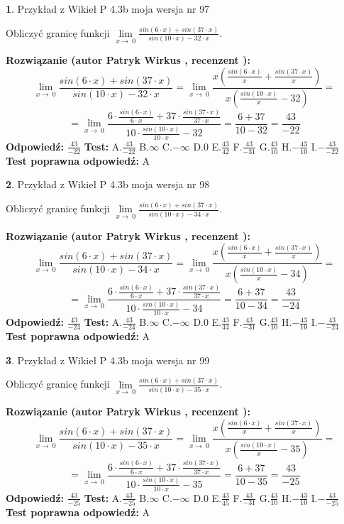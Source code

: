 \documentclass[12pt, a4paper]{article}
\theoremstyle{definition} %
\newtheorem{zad}{}
\newcommand{\zadStart}[1]{\begin{zad}#1\newline}
\newcommand{\zadStop}{\end{zad}}
\newcommand{\rozwStart}[2]{\noindent \textbf{Rozwiązanie (autor #1 , recenzent #2): }\newline}
\newcommand{\rozwStop}{\newline}
\newcommand{\odpStart}{\noindent \textbf{Odpowiedź:}\newline}
\newcommand{\odpStop}{\newline}
\newcommand{\testStart}{\noindent \textbf{Test:}\newline}
\newcommand{\testStop}{\newline}
\newcommand{\kluczStart}{\noindent \textbf{Test poprawna odpowiedź:}\newline}
\newcommand{\kluczStop}{\newline}
\begin{document}
\zadStart{Przykład z Wikieł P 4.3b moja wersja nr 97}


Obliczyć granicę funkcji $\lim\limits_{x\to\ 0}\frac{sin(6 \cdot x)+sin(37 \cdot x)}{sin(10 \cdot x)-32 \cdot x}$.
\zadStop
\rozwStart{Patryk Wirkus}{}
$$\lim\limits_{x\to\ 0}\frac{sin(6 \cdot x)+sin(37 \cdot x)}{sin(10 \cdot x)-32 \cdot x}=\lim\limits_{x\to\ 0}\frac{x(\frac{sin(6 \cdot x)}{x}+\frac{sin(37 \cdot x)}{x})}{x(\frac{sin(10 \cdot x)}{x}-32)}=$$
$$=\lim\limits_{x\to\ 0}\frac{6 \cdot \frac{sin(6 \cdot x)}{6 \cdot x}+37 \cdot \frac{sin(37 \cdot x)}{37 \cdot x}}{10 \cdot \frac{sin(10 \cdot x)}{10 \cdot x}-32}=\frac{6+37}{10-32} = \frac{43}{-22}$$
\rozwStop
\odpStart
$\frac{43}{-22}$
\odpStop
\testStart
A.$\frac{43}{-22}$
B.$\infty$
C.$-\infty$
D.$0$
E.$\frac{43}{42}$
F.$\frac{43}{-31}$
G.$\frac{43}{10}$
H.$-\frac{43}{10}$
I.$-\frac{43}{-22}$
\testStop
\kluczStart
A
\kluczStop



\zadStart{Przykład z Wikieł P 4.3b moja wersja nr 98}


Obliczyć granicę funkcji $\lim\limits_{x\to\ 0}\frac{sin(6 \cdot x)+sin(37 \cdot x)}{sin(10 \cdot x)-34 \cdot x}$.
\zadStop
\rozwStart{Patryk Wirkus}{}
$$\lim\limits_{x\to\ 0}\frac{sin(6 \cdot x)+sin(37 \cdot x)}{sin(10 \cdot x)-34 \cdot x}=\lim\limits_{x\to\ 0}\frac{x(\frac{sin(6 \cdot x)}{x}+\frac{sin(37 \cdot x)}{x})}{x(\frac{sin(10 \cdot x)}{x}-34)}=$$
$$=\lim\limits_{x\to\ 0}\frac{6 \cdot \frac{sin(6 \cdot x)}{6 \cdot x}+37 \cdot \frac{sin(37 \cdot x)}{37 \cdot x}}{10 \cdot \frac{sin(10 \cdot x)}{10 \cdot x}-34}=\frac{6+37}{10-34} = \frac{43}{-24}$$
\rozwStop
\odpStart
$\frac{43}{-24}$
\odpStop
\testStart
A.$\frac{43}{-24}$
B.$\infty$
C.$-\infty$
D.$0$
E.$\frac{43}{44}$
F.$\frac{43}{-31}$
G.$\frac{43}{10}$
H.$-\frac{43}{10}$
I.$-\frac{43}{-24}$
\testStop
\kluczStart
A
\kluczStop



\zadStart{Przykład z Wikieł P 4.3b moja wersja nr 99}


Obliczyć granicę funkcji $\lim\limits_{x\to\ 0}\frac{sin(6 \cdot x)+sin(37 \cdot x)}{sin(10 \cdot x)-35 \cdot x}$.
\zadStop
\rozwStart{Patryk Wirkus}{}
$$\lim\limits_{x\to\ 0}\frac{sin(6 \cdot x)+sin(37 \cdot x)}{sin(10 \cdot x)-35 \cdot x}=\lim\limits_{x\to\ 0}\frac{x(\frac{sin(6 \cdot x)}{x}+\frac{sin(37 \cdot x)}{x})}{x(\frac{sin(10 \cdot x)}{x}-35)}=$$
$$=\lim\limits_{x\to\ 0}\frac{6 \cdot \frac{sin(6 \cdot x)}{6 \cdot x}+37 \cdot \frac{sin(37 \cdot x)}{37 \cdot x}}{10 \cdot \frac{sin(10 \cdot x)}{10 \cdot x}-35}=\frac{6+37}{10-35} = \frac{43}{-25}$$
\rozwStop
\odpStart
$\frac{43}{-25}$
\odpStop
\testStart
A.$\frac{43}{-25}$
B.$\infty$
C.$-\infty$
D.$0$
E.$\frac{43}{45}$
F.$\frac{43}{-31}$
G.$\frac{43}{10}$
H.$-\frac{43}{10}$
I.$-\frac{43}{-25}$
\testStop
\kluczStart
A
\kluczStop
\end{document}
